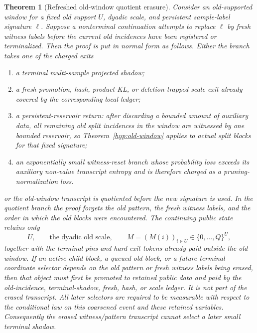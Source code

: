 \documentclass[11pt]{article}
\newtheorem{theorem}{Theorem}[section]
\begin{document}
\begin{theorem}[Refreshed old-window quotient erasure]
\label{hyp:witness-reset}
Consider an old-supported window for a fixed old support $U$, dyadic scale,
and persistent sample-label signature $\ell$.  Suppose a nonterminal
continuation attempts to replace $\ell$ by fresh witness labels before the
current old incidences have been registered or terminalized.  Then the proof is
put in normal form as follows.  Either the branch takes one of the charged
exits
\begin{enumerate}[label=\textup{(\roman*)}]
\item a terminal multi-sample projected shadow;
\item a fresh promotion, hash, product-KL, or deletion-trapped scale exit
already covered by the corresponding local ledger;
\item a persistent-reservoir return: after discarding a bounded amount of
auxiliary data, all remaining old split incidences in the window are witnessed
by one bounded reservoir, so Theorem~\ref{hyp:old-window} applies to actual
split blocks for that fixed signature;
\item an exponentially small witness-reset branch whose probability loss
exceeds its auxiliary non-value transcript entropy and is therefore charged as
a pruning-normalization loss.
\end{enumerate}
or the old-window transcript is quotiented before the new signature is used.
In the quotient branch the proof forgets the old pattern, the fresh witness
labels, and the order in which the old blocks were encountered.  The continuing
public state retains only
\[
  U,\qquad \text{the dyadic old scale},\qquad
  M=(M(i))_{i\in U}\in\{0,\ldots,Q\}^U,
\]
together with the terminal pins and hard-exit tokens already paid outside the
old window.  If an active child block, a queued old block, or a future terminal
coordinate selector depends on the old pattern or fresh witness labels being
erased, then that object must first be promoted to retained public data and
paid by the old-incidence, terminal-shadow, fresh, hash, or scale ledger.  It is
not part of the erased transcript.  All later selectors are required to be
measurable with respect to the conditional law on this coarsened event and
these retained variables.
Consequently the erased witness/pattern transcript cannot select a later small
terminal shadow.


\end{theorem}
\end{document}
